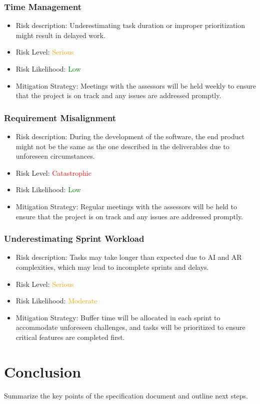\documentclass[12pt]{article}
\begin{document}
        \subsubsection{Time Management}
        \begin{itemize}
            \item Risk description: Underestimating  task duration or improper prioritization might result in delayed work.
            \item Risk Level: \textcolor{orange}{Serious}
            \item Risk Likelihood: \textcolor{green}{Low}
            \item Mitigation Strategy: Meetings with the assessors will be held weekly to ensure that the project is on track and any issues are addressed promptly.
        \end{itemize}

        \subsubsection{Requirement Misalignment}
        \begin{itemize}
            \item Risk description: During the development of the software, the end product might not be the same as the one described in the deliverables due to unforeseen circumstances.
            \item Risk Level: \textcolor{red}{Catastrophic}
            \item Risk Likelihood: \textcolor{green}{Low}
            \item Mitigation Strategy: Regular meetings with the assessors will be held to ensure that the project is on track and any issues are addressed promptly.
        \end{itemize}

        \subsubsection{Underestimating Sprint Workload}
        \begin{itemize}
            \item Risk description: Tasks may take longer than expected due to AI and AR complexities, which may lead to incomplete sprints and delays.
            \item Risk Level: \textcolor{orange}{Serious}
            \item Risk Likelihood: \textcolor{orange}{Moderate}
            \item Mitigation Strategy: Buffer time will be allocated in each sprint to accommodate unforeseen challenges, and tasks will be prioritized to ensure critical features are completed first.
        \end{itemize}

\section{Conclusion}
Summarize the key points of the specification document and outline next steps.
\end{document}
